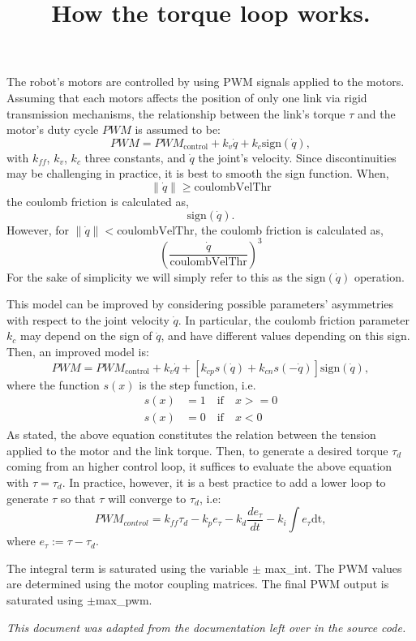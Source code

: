 \documentclass{article}
\begin{document}
\title{How the torque loop works.}
\maketitle



The robot's motors are controlled by using PWM signals applied to the motors. Assuming that each motors affects the position of only one link via rigid transmission mechanisms, the relationship between the link's torque $ \tau $ and the motor's duty cycle $ PWM $ is assumed to be:
$$
  PWM  = {PWM}_{\text{control}} + k_v \dot{q} + k_c \mbox{sign}(\dot{q}),
$$
with $k_{ff}$, $k_v$, $k_c$ three constants, and $\dot{q}$ the joint's velocity.
Since discontinuities may be challenging in practice, it is best to smooth the sign function. When,
$$
\|\dot{q}\| \geq \text{coulombVelThr}
$$
the coulomb friction is calculated as,
$$
\mbox{sign}(\dot{q}).
$$
However, for $\|\dot{q}\| < \text{coulombVelThr}$, the coulomb friction is calculated as,
$$
\left(\frac{\dot{q}}{\text{coulombVelThr}}\right)^3
$$
For the sake of simplicity we will simply refer to this as the $\mbox{sign}(\dot{q})$ operation.

This model can be improved by considering possible parameters' asymmetries with respect to the joint velocity $\dot{q}$.
In particular, the coulomb friction parameter  $k_c$ may depend on the sign of $\dot{q}$, and have different
values depending on this sign. Then, an improved model is:
$$
  PWM  = {PWM}_{\text{control}} + k_{v} \dot{q} + [k_{cp} s(\dot{q}) + k_{cn} s(-\dot{q})] \mbox{sign}(\dot{q}),
$$
where the function $s(x)$ is the step function, i.e.
\begin{align}
    s(x) &=  1 \quad \mbox{if} \quad x >= 0 \\
    s(x) &=  0 \quad \mbox{if} \quad x < 0
\end{align}
%
As stated, the above equation constitutes the relation between the tension applied to the motor and the link torque.
Then, to generate a desired torque $\tau_d$ coming from an higher control loop, it suffices to evaluate the above equation
with $\tau = \tau_d$. In practice, however, it is a best practice to add a lower loop to generate $\tau$ so that $\tau$
will converge to $\tau_d$, i.e:
$$
  {PWM}_{control} = k_{ff} \tau_d - k_p e_{\tau} - k_d \frac{de_{\tau}}{dt} - k_i \int e_{\tau} \mbox{dt},
$$
%
where $e_{\tau} := \tau - \tau_{d}$.

The integral term is saturated using the variable $\pm$ max\_int. The PWM values are determined using the motor coupling matrices. The final PWM output is saturated using $\pm$max\_pwm.



\begin{center}
\noindent \textit{This document was adapted from the documentation left over in the source code.}
\end{center}
\end{document}
